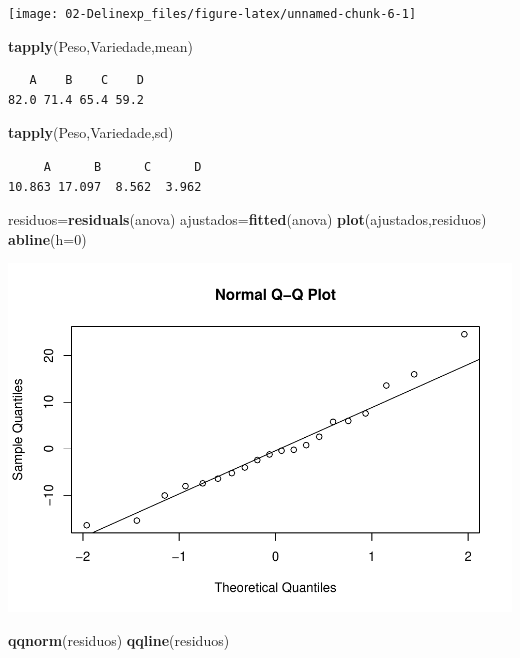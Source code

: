 \documentclass[12pt,brazil,oneside]{book}
\newenvironment{Shaded}{\begin{snugshade}}{\end{snugshade}}
\newcommand{\DataTypeTok}[1]{\textcolor[rgb]{0.13,0.29,0.53}{#1}}
\newcommand{\DecValTok}[1]{\textcolor[rgb]{0.00,0.00,0.81}{#1}}
\newcommand{\KeywordTok}[1]{\textcolor[rgb]{0.13,0.29,0.53}{\textbf{#1}}}
\newcommand{\NormalTok}[1]{#1}
\begin{document}
\begin{center}\texttt{[image: 02-Delinexp\_files/figure-latex/unnamed-chunk-6-1]} \end{center}

\begin{Shaded}
\begin{Highlighting}[]
\KeywordTok{tapply}\NormalTok{(Peso,Variedade,mean)}
\end{Highlighting}
\end{Shaded}

\begin{verbatim}
   A    B    C    D 
82.0 71.4 65.4 59.2 
\end{verbatim}

\begin{Shaded}
\begin{Highlighting}[]
\KeywordTok{tapply}\NormalTok{(Peso,Variedade,sd)}
\end{Highlighting}
\end{Shaded}

\begin{verbatim}
     A      B      C      D 
10.863 17.097  8.562  3.962 
\end{verbatim}

\begin{Shaded}
\begin{Highlighting}[]
\NormalTok{residuos=}\KeywordTok{residuals}\NormalTok{(anova)}
\NormalTok{ajustados=}\KeywordTok{fitted}\NormalTok{(anova)}
\KeywordTok{plot}\NormalTok{(ajustados,residuos)}
\KeywordTok{abline}\NormalTok{(}\DataTypeTok{h=}\DecValTok{0}\NormalTok{)}
\end{Highlighting}
\end{Shaded}

\begin{center}\includegraphics[width=0.6\linewidth]{02-Delinexp_files/figure-latex/unnamed-chunk-8-1} \end{center}

\begin{Shaded}
\begin{Highlighting}[]
\KeywordTok{qqnorm}\NormalTok{(residuos)}
\KeywordTok{qqline}\NormalTok{(residuos)}
\end{Highlighting}
\end{Shaded}
\end{document}
